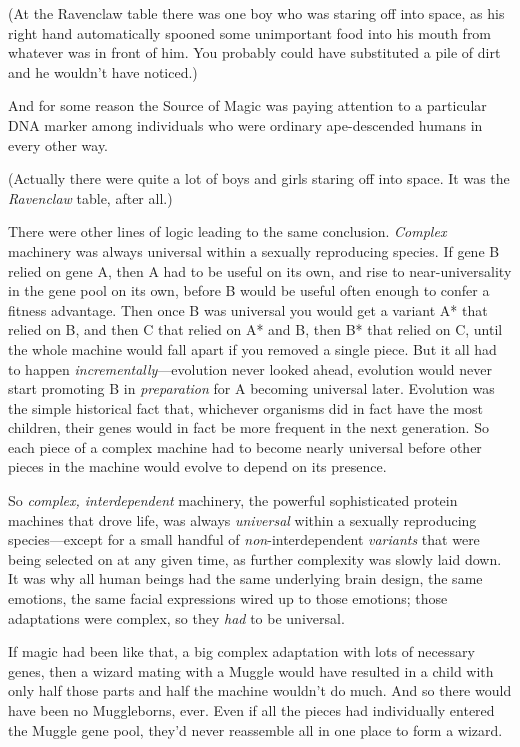 (At the Ravenclaw table there was one boy who was staring off into space, as his right hand automatically spooned some unimportant food into his mouth from whatever was in front of him. You probably could have substituted a pile of dirt and he wouldn’t have noticed.)

And for some reason the Source of Magic was paying attention to a particular DNA marker among individuals who were ordinary ape-descended humans in every other way.

(Actually there were quite a lot of boys and girls staring off into space. It was the \emph{Ravenclaw} table, after all.)

There were other lines of logic leading to the same conclusion. \emph{Complex} machinery was always universal within a sexually reproducing species. If gene B relied on gene A, then A had to be useful on its own, and rise to near-universality in the gene pool on its own, before B would be useful often enough to confer a fitness advantage. Then once B was universal you would get a variant A* that relied on B, and then C that relied on A* and B, then B* that relied on C, until the whole machine would fall apart if you removed a single piece. But it all had to happen \emph{incrementally}—evolution never looked ahead, evolution would never start promoting B in \emph{preparation} for A becoming universal later. Evolution was the simple historical fact that, whichever organisms did in fact have the most children, their genes would in fact be more frequent in the next generation. So each piece of a complex machine had to become nearly universal before other pieces in the machine would evolve to depend on its presence.

So \emph{complex, interdependent} machinery, the powerful sophisticated protein machines that drove life, was always \emph{universal} within a sexually reproducing species—except for a small handful of \emph{non}-interdependent \emph{variants} that were being selected on at any given time, as further complexity was slowly laid down. It was why all human beings had the same underlying brain design, the same emotions, the same facial expressions wired up to those emotions; those adaptations were complex, so they \emph{had} to be universal.

If magic had been like that, a big complex adaptation with lots of necessary genes, then a wizard mating with a Muggle would have resulted in a child with only half those parts and half the machine wouldn’t do much. And so there would have been no Muggleborns, ever. Even if all the pieces had individually entered the Muggle gene pool, they’d never reassemble all in one place to form a wizard.

